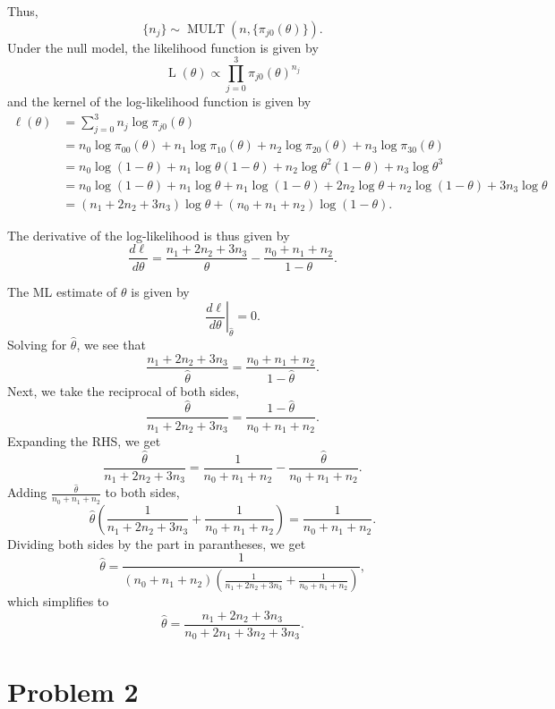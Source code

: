 \documentclass[
]{article}
\begin{document}
Thus, \[
  \{n_j\} \sim \operatorname{MULT}(n, \{\pi_{j 0}(\theta)\}).
\] Under the null model, the likelihood function is given by \[
  \operatorname{L}(\theta) \propto \prod_{j=0}^{3} \pi_{j 0}(\theta)^{n_j}
\] and the kernel of the log-likelihood function is given by
\begin{align*}
  \operatorname{\ell}(\theta)
    &= \sum_{j=0}^{3} n_j \log \pi_{j 0}(\theta)\\
    &= n_0 \log \pi_{0 0}(\theta) +
       n_1 \log \pi_{1 0}(\theta) +
       n_2 \log \pi_{2 0}(\theta) +
       n_3 \log \pi_{3 0}(\theta)\\
    &= n_0 \log (1-\theta) +
       n_1 \log \theta(1-\theta) +
       n_2 \log \theta^2(1-\theta) +
       n_3 \log \theta^3\\
    &= n_0 \log (1-\theta) +
       n_1 \log \theta + n_1 \log (1-\theta) +
       2 n_2 \log \theta + n_2 \log (1-\theta) +
       3 n_3 \log \theta\\
    &= (n_1 + 2 n_2 + 3 n_3) \log \theta + (n_0 + n_1 + n_2) \log (1-\theta).
\end{align*}

The derivative of the log-likelihood is thus given by \[
  \frac{d \operatorname{\ell}}{d \theta} =
    \frac{n_1 + 2 n_2 + 3 n_3}{\theta} - \frac{n_0 + n_1 + n_2}{1-\theta}.
\]

The ML estimate of \(\theta\) is given by \[
  \left. \frac{d \operatorname{\ell}}{d \theta} \right\vert_{\hat\theta} = 0.
\] Solving for \(\hat\theta\), we see that \[
  \frac{n_1 + 2 n_2 + 3 n_3}{\hat\theta} = \frac{n_0 + n_1 + n_2}{1-\hat\theta}.
\] Next, we take the reciprocal of both sides, \[
  \frac{\hat\theta}{n_1 + 2 n_2 + 3 n_3} = \frac{1-\hat\theta}{n_0 + n_1 + n_2}.
\] Expanding the RHS, we get \[
  \frac{\hat\theta}{n_1 + 2 n_2 + 3 n_3} = \frac{1}{n_0 + n_1 + n_2}-\frac{\hat\theta}{n_0 + n_1 + n_2}.
\] Adding \(\frac{\hat\theta}{n_0 + n_1 + n_2}\) to both sides, \[
  \hat\theta \left(\frac{1}{n_1 + 2 n_2 + 3 n_3} + \frac{1}{n_0 + n_1 + n_2}\right) = \frac{1}{n_0 + n_1 + n_2}.
\] Dividing both sides by the part in parantheses, we get \[
  \hat\theta = \frac{1}{(n_0 + n_1 + n_2) \left(\frac{1}{n_1 + 2 n_2 + 3 n_3} + \frac{1}{n_0 + n_1 + n_2}\right)},
\] which simplifies to \[
  \hat\theta = \frac{n_1 + 2 n_2 + 3 n_3}{n_0 + 2 n_1 + 3 n_2 + 3 n_3}.
\]

\hypertarget{problem-2}{%
\section{Problem 2}\label{problem-2}}
\end{document}
